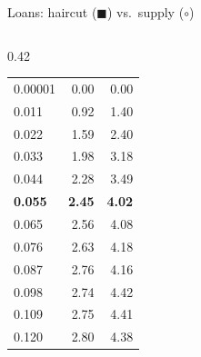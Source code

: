 \documentclass[aspectratio=169,10pt]{beamer}
\begin{document}
\begin{frame}{Loans: haircut ($\blacksquare$) vs.\ supply ($\circ$)}
\begin{columns}[T]
\begin{column}{0.42\textwidth}
\begin{tabular}{lrr}
        \midrule
        0.00001 & 0.00 & 0.00 \\
        0.011 & 0.92 & 1.40 \\
        0.022 & 1.59 & 2.40 \\
        0.033 & 1.98 & 3.18 \\
        0.044 & 2.28 & 3.49 \\
        \textbf{0.055} & \textbf{2.45} & \textbf{4.02} \\
        0.065 & 2.56 & 4.08 \\
        0.076 & 2.63 & 4.18 \\
        0.087 & 2.76 & 4.16 \\
        0.098 & 2.74 & 4.42 \\
        0.109 & 2.75 & 4.41 \\
        0.120 & 2.80 & 4.38 \\
        \bottomrule
      \end{tabular}
    \end{column}
  \end{columns}
\end{frame}
\end{document}
